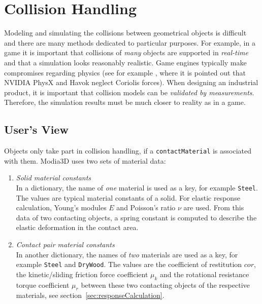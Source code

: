 
\section{Collision Handling}\label{sec:collHandling}

Modeling and simulating the collisions between geometrical objects is difficult and there are many
methods dedicated to particular purposes. For example, in a game it is important that  
collisions of \emph{many} objects are supported in \emph{real-time} and that a simulation looks 
reasonably realistic. Game engines typically make compromises regarding physics (see for
example \cite{Erez2015}, where it is pointed out that NVIDIA PhysX and Havok neglect
Coriolis forces).
When designing an industrial product, it is important that collision models can be \emph{validated by measurements}. Therefore, the simulation results must
be much closer to reality as in a game.


\subsection{User's View}

Objects only take part in collision handling, if a \texttt{contactMaterial} is
associated with them. Modia3D uses two sets of material data:

\begin{enumerate}
\item \emph{Solid material constants}\\
      In a dictionary, the name of \emph{one} material is used as a key, for example \texttt{Steel}. 
      The values are typical material constants of a solid. For elastic response calculation,
      Young's modules $E$ and Poisson's ratio $\nu$ are used. From this data of two contacting
      objects, a spring constant is computed to describe the elastic deformation in the contact area.

\item \emph{Contact pair material constants}\\
      In another dictionary, the names of \emph{two} materials are used as a key, for example \texttt{Steel} 
      and \texttt{DryWood}. The values are the coefficient of restitution $cor$, 
      the kinetic/sliding friction force coefficient $\mu_k$ and the 
      rotational resistance torque coefficient $\mu_r$ between these two contacting
      objects of the respective materials, see section~\ref{sec:responseCalculation}.
\end{enumerate}  

